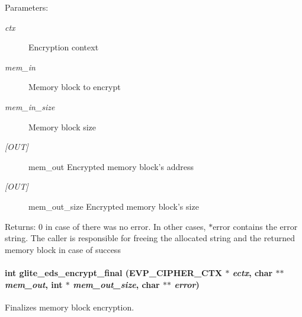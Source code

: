 \begin{Desc}
\item[Parameters:]
\begin{description}
\item[{\em ctx}]Encryption context \item[{\em mem\_\-in}]Memory block to encrypt \item[{\em mem\_\-in\_\-size}]Memory block size \item[{\em \mbox{[}OUT\mbox{]}}]mem\_\-out Encrypted memory block's address \item[{\em \mbox{[}OUT\mbox{]}}]mem\_\-out\_\-size Encrypted memory block's size\end{description}
\end{Desc}
\begin{Desc}
\item[Returns:]0 in case of there was no error. In other cases, $\ast$error contains the error string. The caller is responsible for freeing the allocated string and the returned memory block in case of success \end{Desc}
\hypertarget{eds-simple_8h_a5}{
\paragraph[glite\_\-eds\_\-encrypt\_\-final]{\setlength{\rightskip}{0pt plus 5cm}int glite\_\-eds\_\-encrypt\_\-final (EVP\_\-CIPHER\_\-CTX $\ast$ {\em ectx}, char $\ast$$\ast$ {\em mem\_\-out}, int $\ast$ {\em mem\_\-out\_\-size}, char $\ast$$\ast$ {\em error})}\hfill}
\label{eds-simple_8h_a5}


Finalizes memory block encryption. 

